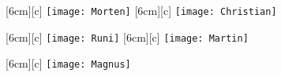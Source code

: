 \begin{titlepage}
\maketitle
\thispagestyle{empty}
\FloatBarrier
\begin{figure}[h]
	\centering
	[6cm][c]
		{\texttt{[image: Morten]}}
	\hspace{1.5cm}
	[6cm][c]
		{\texttt{[image: Christian]}}
\end{figure}
\begin{figure}[h]
	\centering
	[6cm][c]
		{\texttt{[image: Runi]}}
	\hspace{1.5cm}
	[6cm][c]
		{\texttt{[image: Martin]}}
\end{figure}
\begin{figure}[h]
	\centering
	[6cm][c]
		{\texttt{[image: Magnus]}}
\end{figure}
\FloatBarrier
\end{titlepage}